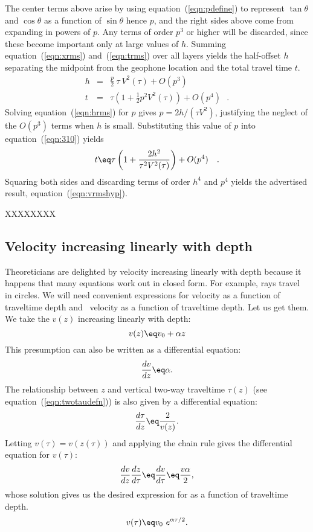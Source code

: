 {The center terms above arise by using equation~(\ref{eqn:pdefine})
to represent $\tan\theta$ and $\cos\theta$
as a function of $\sin\theta$ hence $p$,
and the right sides above come from expanding in powers of $p$.
Any terms of order $p^3$ or higher will be discarded,
since these become important only at large values of $h$.
Summing equation~(\ref{eqn:xrms}) and~(\ref{eqn:trms}) over all layers
yields the half-offset $h$ separating the midpoint
from the geophone location and the total travel time $t$.
\begin{eqnarray}
\label{eqn:hrms}
h &=&\frac{p}{2}\ \tau \  V^2(\tau) + O(p^3) \\
\label{eqn:310}
t &=&\tau \left( 1 + \frac{1}{2} p^2 V^2(\tau) \right) + O(p^4) \ \ \ .
\end{eqnarray}
Solving equation~(\ref{eqn:hrms}) for $p$ gives $p=2h/(\tau V^2)$,
justifying the neglect of the $O(p^3)$ terms when $h$ is small.
Substituting this value of $p$ into equation~(\ref{eqn:310}) yields
\begin{equation}
t \eq \tau \left( 1 + \frac{2h^2}{\tau^2 V^2(\tau)} \right) + O(p^4) \ \ \ .
\end{equation}
Squaring both sides and discarding terms of order $h^4$ and $p^4$
yields the advertised result, equation~(\ref{eqn:vrmshyp}).

 XXXXXXXX
 }

\subsection{Velocity increasing linearly with depth}
Theoreticians are delighted by velocity increasing linearly with depth
because it happens that many equations work out in closed form.
For example, rays travel in circles.
We will need convenient expressions for velocity
as a function of traveltime depth
and \RMS\ velocity as a function of traveltime depth.
Let us get them.
We take the  $v(z)$ increasing linearly with depth:
\begin{equation}
v(z) \eq v_0 + \alpha z
\end{equation}
%
This presumption can also be written as a differential equation:
\begin{equation}
\frac{dv}{dz} \eq \alpha  .
\end{equation}
%
The relationship between $z$ and vertical two-way traveltime $\tau(z)$
(see equation~(\ref{eqn:twotaudefn})) is also given by a differential equation:
\begin{equation}
\frac{d \tau}{dz} \eq \frac{2}{v(z)}.
\end{equation}
%
Letting $v(\tau)=v(z(\tau))$
and applying the chain rule
gives the differential equation for $v(\tau)$:
\begin{equation}
\frac{dv}{dz}
\frac{dz}{d \tau}
\eq
\frac{dv}{d \tau}
\eq
\frac{v \alpha}{2},
\end{equation}
whose solution gives us the desired expression for 
as a function of traveltime depth.
\begin{equation}
v(\tau) \eq v_0 \ e^{\alpha \tau / 2 }  .
\label{eqn:priorint}
\end{equation}
%

